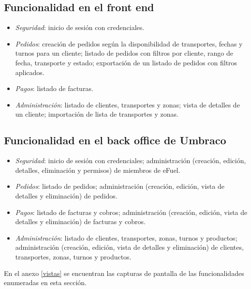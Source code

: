 \subsection{Funcionalidad en el front end}
\begin{itemize}
    \item \emph{Seguridad}: inicio de sesión con credenciales.
    
    \item \emph{Pedidos}: creación de pedidos según la disponibilidad de transportes, fechas y turnos para un cliente; listado de pedidos con filtros por cliente, rango de fecha, transporte y estado; exportación de un listado de pedidos con filtros aplicados.

    \item \emph{Pagos}: listado de facturas.
    
    \item \emph{Administración}: listado de clientes, transportes y zonas; vista de detalles de un cliente; importación de lista de transportes y zonas.
\end{itemize}

\subsection{Funcionalidad en el back office de Umbraco}
\begin{itemize}
    \item \emph{Seguridad}: inicio de sesión con credenciales; administración (creación, edición, detalles, eliminación y permisos) de miembros de eFuel.
    
    \item \emph{Pedidos}: listado de pedidos; administración (creación, edición, vista de detalles y eliminación) de pedidos.
    
    \item \emph{Pagos}: listado de facturas y cobros; administración (creación, edición, vista de detalles y eliminación) de facturas y cobros.
    
    \item \emph{Administración}: listado de clientes, transportes, zonas, turnos y productos; administración (creación, edición, vista de detalles y eliminación) de clientes, transportes, zonas, turnos y productos.
\end{itemize}

En el anexo \ref{vistas} se encuentran las capturas de pantalla de las funcionalidades enumeradas en esta sección.